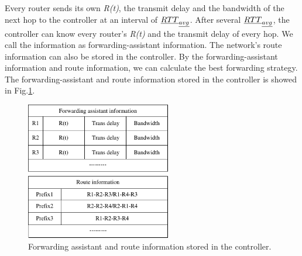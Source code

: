 Every router sends its own \emph{R(t)}, the transmit delay and the bandwidth of the next hop to the controller at an interval of $\emph{RTT}_{\emph{avg}}$. After several $\emph{RTT}_{\emph{avg}}$, the controller can know every router's \emph{R(t)} and the transmit delay of every hop. We call the information as forwarding-assistant information. The network's route information can also be stored in the controller. By the forwarding-assistant information and route information, we can calculate the best forwarding strategy. The forwarding-assistant and route information stored in the controller is showed in Fig.\ref{fig-assistant-information}.

\begin{figure}[t]
\centering
\includegraphics[width=2.5in]{forwarding-assistant-information.pdf}
\centering
\caption{Forwarding assistant and route information stored in the controller.}
\label{fig-assistant-information}
\end{figure}


